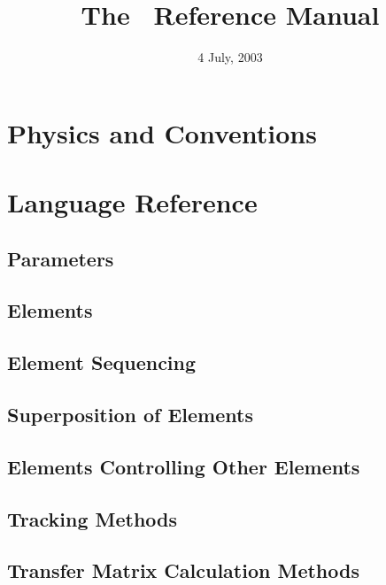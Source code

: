 \documentclass{book}
\begin{document}
\title{The \bmad\ Reference Manual}

\date{4 July, 2003}
\maketitle



\tableofcontents
\listoffigures
\listoftables

\part{Physics and Conventions}



\part{Language Reference}


\chapter{Parameters}
\chapter{Elements}
\chapter{Element Sequencing}
\chapter{Superposition of Elements}
\chapter{Elements Controlling Other Elements}
\chapter{Tracking Methods}
\chapter{Transfer Matrix Calculation Methods}
\end{document}
